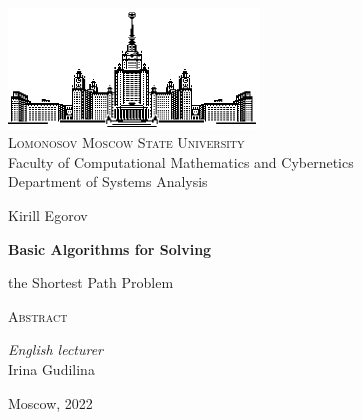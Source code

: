 \thispagestyle{empty}
\begin{center}
    \ \vspace{-3cm}

    \includegraphics[width=0.5\textwidth]{title_page/msu.eps}\\

    {\small{\scshape  Lomonosov Moscow State University}\\
    Faculty of Computational Mathematics and Cybernetics\\
    Department of Systems Analysis}

    \vfill

    {\Large Kirill Egorov}

    \vspace{1cm}

    {\LARGE\bfseries Basic Algorithms for Solving \par the Shortest Path Problem}

    \vspace{1.5cm}

    {\scshape Abstract}
\end{center}

\vspace{3cm}

\begin{flushright}
    \large
    \textit{English lecturer}\\
    Irina Gudilina 
\end{flushright}

\vfill

\begin{center}
    Moscow, 2022
\end{center}

\clearpage